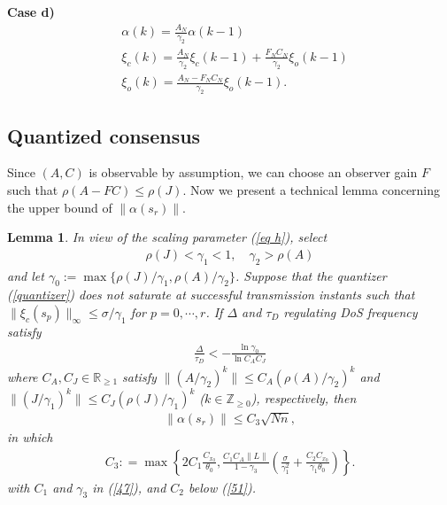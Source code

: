 \documentclass[letterpaper,journal,final,twocolumn]{IEEEtran}
\newtheorem{itlemma}{Lemma}
\newenvironment{lemma}{\begin{itlemma}\rm}{\end{itlemma}}
\begin{document}
\textbf{Case d)} 
\begin{subequations}\label{case d 1}  
	\begin{align}
	&\alpha(k) = \frac{A_N }{\gamma_2} \alpha(k-1)  \\
	&\xi_c(k) =  \frac{A_N }{\gamma_2}  \xi_c(k-1)+\frac{F_NC_N}{\gamma_2}\xi_o (k-1)\\
	&\xi_o(k) = \frac{A_N-F_NC_N}{\gamma_2} \xi_o (k-1).
	\end{align}
\end{subequations}












\subsection{Quantized consensus}


Since $(A,C)$ is observable by assumption, we can choose an observer gain $F$ such that $\rho(A-FC) \le \rho(J)$. 
Now we present a technical lemma concerning the upper bound of $\| \alpha(s_r) \|$. 

\begin{lemma}\label{Lemma3}
In view of the scaling parameter (\ref{eq h}), select
\begin{align}\label{34}
\rho(J)< \gamma _ 1<1,\quad \gamma _2 > \rho(A)
\end{align}
and let $\gamma_0:=\max\{\rho(J)/\gamma_1,\rho(A)/\gamma_2\}$. 
Suppose that the quantizer (\ref{quantizer}) does not saturate at successful transmission instants such that $\|\xi_c (s_p)\|_\infty \le \sigma / \gamma_1$ for $p=0,\cdots, r$.
If $\Delta$ and $\tau_D$ regulating DoS frequency satisfy
\begin{align}\label{bound Lemma 3}
\frac{\Delta}{\tau_D} < -\frac{\ln \gamma_0}{\ln C_A C_J}
\end{align}
where $C_A, C_J \in \mathbb R _{\ge 1}$
satisfy $  \|    (  A/\gamma_2 )^k    \| \le C_A  (  \rho(A)/\gamma_2   )^ k$ and 
$
\|   \left(   J/\gamma_1  \right)^k    \| \le C_{J}  \left(  \rho(J)/\gamma_1 \right)^ k$ ($k \in \mathbb Z _{\ge 0}$), respectively, 
then 
\begin{align}
\| \alpha(s_r)    \|  
\le C_3 \sqrt{Nn},
\end{align}
in which
 \begin{align}
C_3 : =\max \left\{2C_1 \frac{C_{x_0}}{\theta_0} , \frac{C_1 C_A \|L\|}{1-\gamma_3 }  \left(\frac{\sigma}{\gamma_1 ^2} + \frac{C_2 C_{x_0}}{\gamma_1 \theta_0}\right) \right\}.
 \end{align}
with $C_1$ and $\gamma_3$ in (\ref{47}), and $C_2$ below (\ref{51}).
\end{lemma}
\end{document}
